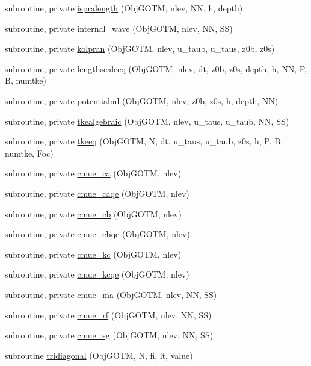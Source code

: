 \begin{DoxyCompactItemize}
\item 
subroutine, private \mbox{\hyperlink{namespacemodulegotm_a8afda9608a508419c6574b11765db424}{ispralength}} (Obj\+G\+O\+TM, nlev, NN, h, depth)
\item 
subroutine, private \mbox{\hyperlink{namespacemodulegotm_a4287a5fde4824d73e35ee66bf90b5f3b}{internal\+\_\+wave}} (Obj\+G\+O\+TM, nlev, NN, SS)
\item 
subroutine, private \mbox{\hyperlink{namespacemodulegotm_a41a284016e83d9fe85740b08ed8abdc2}{kolpran}} (Obj\+G\+O\+TM, nlev, u\+\_\+taub, u\+\_\+taus, z0b, z0s)
\item 
subroutine, private \mbox{\hyperlink{namespacemodulegotm_a82edc4e2eec49fb4f24fc31918908aef}{lengthscaleeq}} (Obj\+G\+O\+TM, nlev, dt, z0b, z0s, depth, h, NN, P, B, numtke)
\item 
subroutine, private \mbox{\hyperlink{namespacemodulegotm_a2ac21e06e59e99b089466cd065b15ca3}{potentialml}} (Obj\+G\+O\+TM, nlev, z0b, z0s, h, depth, NN)
\item 
subroutine, private \mbox{\hyperlink{namespacemodulegotm_afc07b47188fabbcdd572769fce2e7e97}{tkealgebraic}} (Obj\+G\+O\+TM, nlev, u\+\_\+taus, u\+\_\+taub, NN, SS)
\item 
subroutine, private \mbox{\hyperlink{namespacemodulegotm_aa2677c2275ef6e84a615765d4db0772c}{tkeeq}} (Obj\+G\+O\+TM, N, dt, u\+\_\+taus, u\+\_\+taub, z0s, h, P, B, numtke, Foc)
\item 
subroutine, private \mbox{\hyperlink{namespacemodulegotm_a8f3eabf069e4530d9ca2df0e3228c074}{cmue\+\_\+ca}} (Obj\+G\+O\+TM, nlev)
\item 
subroutine, private \mbox{\hyperlink{namespacemodulegotm_a38a0c42b81c2a8bae8ae60d20ed0df23}{cmue\+\_\+caqe}} (Obj\+G\+O\+TM, nlev)
\item 
subroutine, private \mbox{\hyperlink{namespacemodulegotm_a2b38e80c2393abb45f25640cd3fda481}{cmue\+\_\+cb}} (Obj\+G\+O\+TM, nlev)
\item 
subroutine, private \mbox{\hyperlink{namespacemodulegotm_ab183ae0777bf5a1d3c5b4ebbb9c2b9b5}{cmue\+\_\+cbqe}} (Obj\+G\+O\+TM, nlev)
\item 
subroutine, private \mbox{\hyperlink{namespacemodulegotm_a39841630271ec0cdc9e21a9bc1bfc289}{cmue\+\_\+kc}} (Obj\+G\+O\+TM, nlev)
\item 
subroutine, private \mbox{\hyperlink{namespacemodulegotm_ab365e1ebbb95df9750427f6340cac165}{cmue\+\_\+kcqe}} (Obj\+G\+O\+TM, nlev)
\item 
subroutine, private \mbox{\hyperlink{namespacemodulegotm_a35d3226a2d10d64e249360320b18c8a4}{cmue\+\_\+ma}} (Obj\+G\+O\+TM, nlev, NN, SS)
\item 
subroutine, private \mbox{\hyperlink{namespacemodulegotm_a9f8f0a6e92610182a87816932d096a5a}{cmue\+\_\+rf}} (Obj\+G\+O\+TM, nlev, NN, SS)
\item 
subroutine, private \mbox{\hyperlink{namespacemodulegotm_a532d05762eb6990a602d72c0cf825f66}{cmue\+\_\+sg}} (Obj\+G\+O\+TM, nlev, NN, SS)
\item 
subroutine \mbox{\hyperlink{namespacemodulegotm_a95c763a61ad96de7516848ea4a686fdb}{tridiagonal}} (Obj\+G\+O\+TM, N, fi, lt, value)
\end{DoxyCompactItemize}
